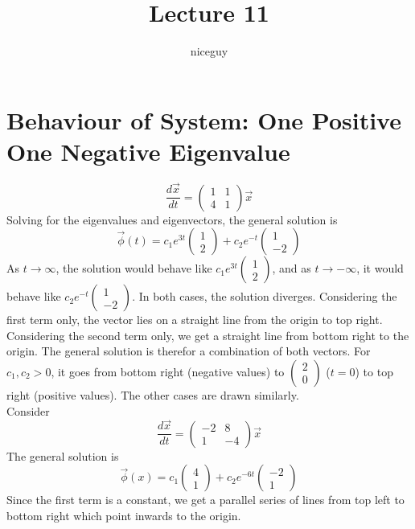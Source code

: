 \documentclass[12pt]{article}
\author{niceguy}
\title{Lecture 11}
\begin{document}
\maketitle
\section{Behaviour of System: One Positive One Negative Eigenvalue}
$$\frac{d\vec{x}}{dt} = \begin{pmatrix} 1 & 1 \\4 & 1\end{pmatrix}\vec{x}$$
Solving for the eigenvalues and eigenvectors, the general solution is
$$\vec{\phi}(t) = c_1e^{3t}\begin{pmatrix} 1 \\2\end{pmatrix} + c_2e^{-t}\begin{pmatrix} 1 \\ -2\end{pmatrix}$$
As $t\rightarrow\infty$, the solution would behave like $c_1e^{3t}\begin{pmatrix} 1 \\ 2 \end{pmatrix}$, and as $t\rightarrow -\infty$, it would behave like $c_2e^{-t}\begin{pmatrix} 1 \\ -2 \end{pmatrix}$. In both cases, the solution diverges. Considering the first term only, the vector lies on a straight line from the origin to top right. Considering the second term only, we get a straight line from bottom right to the origin. The general solution is therefor a combination of both vectors. For $c_1, c_2 > 0$, it goes from bottom right (negative values) to $\begin{pmatrix} 2 \\ 0 \end{pmatrix}$ ($t=0$) to top right (positive values). The other cases are drawn similarly. \\

Consider
$$\frac{d\vec{x}}{dt} = \begin{pmatrix} -2 & 8 \\ 1 & -4 \end{pmatrix} \vec{x}$$
The general solution is
$$\vec{\phi}(x) = c_1\begin{pmatrix} 4 \\ 1 \end{pmatrix} + c_2e^{-6t} \begin{pmatrix} -2 \\ 1 \end{pmatrix}$$
Since the first term is a constant, we get a parallel series of lines from top left to bottom right which point inwards to the origin.
\end{document}
